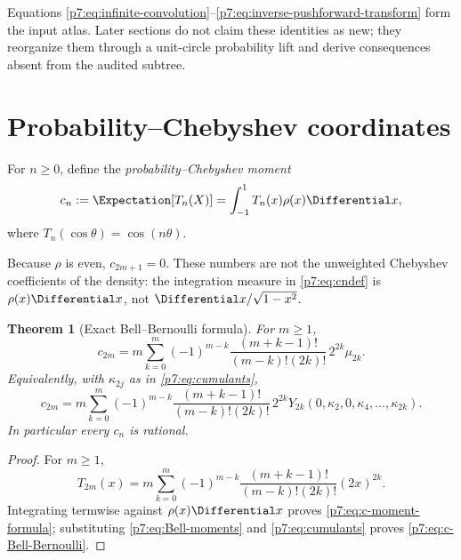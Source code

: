 \documentclass[11pt]{article}
\newtheorem{theorem}{Theorem}[section]
\theoremstyle{definition}
\theoremstyle{remark}
\begin{document}
\begin{baselinebox}
Equations \eqref{p7:eq:infinite-convolution}--\eqref{p7:eq:inverse-pushforward-transform} form the
input atlas. Later sections do not claim these identities as new; they reorganize them
through a unit-circle probability lift and derive consequences absent from the audited
subtree.
\end{baselinebox}

\section{Probability--Chebyshev coordinates}
\label{p7:sec:cheb}

\begin{definition}
For \(n\ge0\), define the \emph{probability--Chebyshev moment}
\begin{equation}
 c_n:=\Expectation[T_n(X)]=\int_{-1}^{1}T_n(x)\rho(x)\Differential x,
 \label{p7:eq:cndef}
\end{equation}
where \(T_n(\cos\theta)=\cos(n\theta)\).
\end{definition}

Because \(\rho\) is even, \(c_{2m+1}=0\). These numbers are not the unweighted Chebyshev
coefficients of the density: the integration measure in \eqref{p7:eq:cndef} is
\(\rho(x)\Differential x\), not \(\Differential x/\sqrt{1-x^2}\).

\begin{theorem}[Exact Bell--Bernoulli formula]
\label{p7:thm:c-exact}
For \(m\ge1\),
\begin{equation}
 c_{2m}=m\sum_{k=0}^{m}(-1)^{m-k}
 \frac{(m+k-1)!}{(m-k)!(2k)!}\,2^{2k}\mu_{2k}.
 \label{p7:eq:c-moment-formula}
\end{equation}
Equivalently, with \(\kappa_{2j}\) as in \eqref{p7:eq:cumulants},
\begin{equation}
 c_{2m}=m\sum_{k=0}^{m}(-1)^{m-k}
 \frac{(m+k-1)!}{(m-k)!(2k)!}\,2^{2k}
 Y_{2k}(0,\kappa_2,0,\kappa_4,\ldots,\kappa_{2k}).
 \label{p7:eq:c-Bell-Bernoulli}
\end{equation}
In particular every \(c_n\) is rational.
\end{theorem}

\begin{proof}
For \(m\ge1\),
\[
 T_{2m}(x)=m\sum_{k=0}^{m}(-1)^{m-k}
 \frac{(m+k-1)!}{(m-k)!(2k)!}(2x)^{2k}.
\]
Integrating termwise against \(\rho(x)\Differential x\) proves \eqref{p7:eq:c-moment-formula}; substituting
\eqref{p7:eq:Bell-moments} and \eqref{p7:eq:cumulants} proves \eqref{p7:eq:c-Bell-Bernoulli}.
\end{proof}
\end{document}
